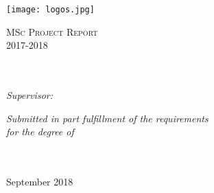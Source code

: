 \documentclass[
12pt, %
english, %
singlespacing, %
headsepline, %
table]{MastersDoctoralThesis} %
\author{Chaochen \textsc{Wang}} %
\begin{document}
\frontmatter %

\pagestyle{plain} %


\begin{titlepage}

\texttt{[image: logos.jpg]} %
\begin{center}



\vspace*{.06\textheight}
{\scshape\LARGE \bfseries \univname\par}\vspace{1.5cm} %
\textsc{\Large MSc Project Report \\ 2017-2018}\\[0.5cm] %

\HRule \\[0.4cm] %
{\Huge \bfseries \ttitle\par}\vspace{0.3cm} %
\HRule \\[1cm] %

\emph{Supervisor:} \\
\href{https://www.lshtm.ac.uk/aboutus/people/palla.luigi}{\supname} %

\vfill

\large \textit{Submitted in part fulfillment of the requirements\\ for the degree of \degreename}\\[0.3cm] %
\groupname\\\deptname\\[1.8cm] %

\vfill

{\large September 2018}\\[4cm] %

\vfill
\end{center}
\end{titlepage}
\end{document}
